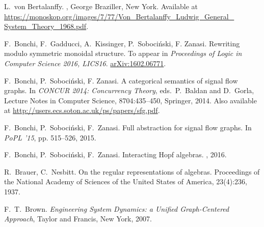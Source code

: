 \begin{thebibliography}{RSW00}

    
    L.\ von Bertalanffy. 
    ,
    George Braziller, New York.
    \newblock Available at
    \href{https://monoskop.org/images/7/77/Von_Bertalanffy_Ludwig_General_System_Theory_1968.pdf}{https://monoskop.org/images/7/77/Von\_Bertalanffy\_Ludwig\_General\_ System\_Theory\_1968.pdf}.

    F.\ Bonchi, F.\ Gadducci, A.\ Kissinger, P.\ Soboci\'nski, F. Zanasi.
    \newblock Rewriting modulo symmetric monoidal structure.
    \newblock To appear in {\sl Proceedings of Logic in Computer Science 2016,
    LICS16}.
    \newblock \href{http://arxiv.org/abs/1602.06771}{arXiv:1602.06771}.

    F.\ Bonchi, P.\ Soboci\'nski, F. Zanasi.
    \newblock A categorical semantics of signal flow graphs.
    \newblock In \emph{CONCUR 2014: Concurrency Theory}, eds.\ P.\ Baldan and
    D.\ Gorla, Lecture Notes in Computer Science, 8704:435--450, Springer, 2014.
    \newblock Also available at
    \href{http://users.ecs.soton.ac.uk/ps/papers/sfg.pdf}
    {http://users.ecs.soton.ac.uk/ps/papers/sfg.pdf}.
    
    F.\ Bonchi, P.\ Soboci\'nski, F.\ Zanasi.
    \newblock Full abstraction for signal flow graphs.
    \newblock In \emph{PoPL '15}, pp. 515--526, 2015.

    F.\ Bonchi, P.\ Soboci\'nski, F.\ Zanasi.
    \newblock Interacting Hopf algebras.
    , 2016.


    R.\ Brauer, C.\ Nesbitt. 
    \newblock On the regular representations of algebras.
    \newblock Proceedings of the National Academy of Sciences of the United
    States of America, 23(4):236, 1937.

    F.\ T.\ Brown.
    \newblock \textsl{Engineering System Dynamics: a 
    Unified Graph-Centered Approach}, Taylor and Francis, New York, 2007. 


\end{thebibliography}
